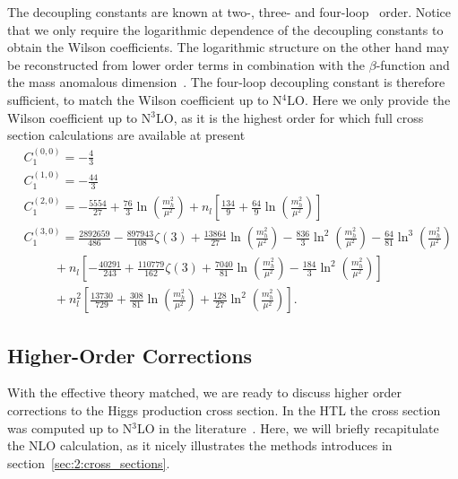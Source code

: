 The decoupling constants are known at two-, three-\cite{Chetyrkin:1997sg} and four-loop~\cite{Schroder:2005hy, Chetyrkin:2005ia} order. Notice that we only require the logarithmic dependence of the decoupling constants to obtain the Wilson coefficients. The logarithmic structure on the other hand may be reconstructed from lower order terms in combination with the $\beta$-function and the mass anomalous dimension~\cite{Chetyrkin:1997un}. The four-loop decoupling constant is therefore sufficient, to match the Wilson coefficient up to N${}^4$LO. Here we only provide the Wilson coefficient up to N${}^3$LO, as it is the highest order for which full cross section calculations are available at present
\begin{equation}
\begin{split}
&C_1^{(0,0)} = -\frac{4}{3} \\
&C_1^{(1,0)} = -\frac{44}{3} \\
&C_1^{(2,0)} = -\frac{5554}{27}  + \frac{76}{3} \ln\!\left(\frac{m_h^2}{\mu^2} \right) +  n_l \left[\frac{134}{9} + \frac{64}{9} \ln\!\left(\frac{m_h^2}{\mu^2} \right) \right] \\
&C_1^{(3,0)} = \frac{2892659}{486} - \frac{897943}{108} \zeta (3) + \frac{13864}{27} \ln\!\left(\frac{m_h^2}{\mu^2} \right) - \frac{836}{3} \ln^2\!\left(\frac{m_h^2}{\mu^2} \right) - \frac{64}{81} \ln^3\!\left(\frac{m_h^2}{\mu^2} \right) \\
& \hspace{1cm} + n_l \left[-\frac{40291}{243} + \frac{110779}{162} \zeta (3) + \frac{7040}{81} \ln\!\left(\frac{m_h^2}{\mu^2} \right) - \frac{184}{3} \ln^2\!\left(\frac{m_h^2}{\mu^2} \right) \right]    \\
& \hspace{1cm} + n_l^2 \left[ \frac{13730}{729} + \frac{308}{81} \ln\!\left(\frac{m_h^2}{\mu^2} \right) + \frac{128}{27} \ln^2\!\left(\frac{m_h^2}{\mu^2} \right) \right].
\end{split}
\end{equation}



\subsection{Higher-Order Corrections}
With the effective theory matched, we are ready to discuss higher order corrections to the Higgs production cross section. In the \acs{HTL} the cross section was computed up to N${}^3$LO in the literature~\cite{Dawson:1990zj, Harlander:2002wh, Anastasiou:2002yz, Anastasiou:2016cez}. Here, we will briefly recapitulate the \acs{NLO} calculation, as it nicely illustrates the methods introduces in section~\ref{sec:2:cross_sections}.

